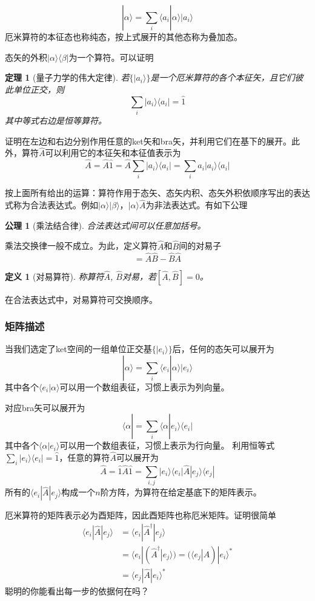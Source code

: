 \documentclass[a4paper,11pt]{ctexart}
\newcommand{\beq}{\begin{equation}}
\newcommand{\eeq}{\end{equation}}
\newcommand{\bea}{\begin{equation}\begin{aligned}}
\newcommand{\eea}{\end{aligned}\end{equation}}
\newcommand{\state}[1]{| #1 \rangle}
\newtheorem{thm}{定理}[section]
\newtheorem{axm}{公理}[section]
\newtheorem{dfn}{定义}[section]
\begin{document}
\beq
| \alpha \rangle = \sum_i \langle a_i | \alpha \rangle | a_i \rangle
\eeq
厄米算符的本征态也称纯态，按上式展开的其他态称为叠加态。
\par
态矢的外积$| \alpha \rangle \langle \beta |$为一个算符。可以证明
\begin{thm}[量子力学的伟大定律]
若$\{ | a_i \rangle \}$是一个厄米算符的各个本征矢，且它们彼此单位正交，则
\beq
\sum_i | a_i \rangle \langle a_i | = \hat{1}
\eeq
其中等式右边是恒等算符。
\end{thm}
证明在左边和右边分别作用任意的ket矢和bra矢，并利用它们在基下的展开。此外，算符$\hat{A}$可以利用它的本征矢和本征值表示为
\beq
\hat{A} = \hat{A} \hat{1} = \hat{A} \sum_i | a_i \rangle \langle a_i | = \sum_i a_i | a_i \rangle \langle a_i |
\eeq
\par
按上面所有给出的运算：算符作用于态矢、态矢内积、态矢外积依顺序写出的表达式称为合法表达式。例如$| \alpha \rangle | \beta \rangle$，$\state{\alpha} \hat{A}$为非法表达式。有如下公理
\begin{axm}[乘法结合律]
合法表达式间可以任意加括号。
\end{axm}
乘法交换律一般不成立。为此，定义算符$\hat{A}$和$\hat{B}$间的对易子
\beq
[\hat{A},\hat{B}] = \hat{A} \hat{B} - \hat{B} \hat{A}
\eeq
\begin{dfn}[对易算符]
称算符$\hat{A}$, $\hat{B}$对易，若$[\hat{A},\hat{B}]=0$。
\end{dfn}
在合法表达式中，对易算符可交换顺序。

\subsubsection{矩阵描述}
当我们选定了ket空间的一组单位正交基$\{ | e_i\rangle \}$后，任何的态矢可以展开为
\beq
| \alpha \rangle = \sum_i \langle e_i | \alpha \rangle | e_i \rangle
\eeq
其中各个$\langle e_i | \alpha \rangle$可以用一个数组表征，习惯上表示为列向量。
\par
对应bra矢可以展开为
\beq
\langle \alpha | = \sum_i \langle \alpha | e_i \rangle \langle e_i |
\eeq
其中各个$\langle \alpha | e_i \rangle$可以用一个数组表征，习惯上表示为行向量。
利用恒等式$\sum_i | e_i \rangle \langle e_i | = \hat{1}$，任意的算符$\hat{A}$可以展开为
\beq
\hat{A} = \hat{1} \hat{A} \hat{1} = \sum_{i,j} | e_i \rangle \langle e_i | \hat{A} | e_j \rangle \langle e_j |
\eeq
所有的$\langle e_i | \hat{A} | e_j \rangle$构成一个$n$阶方阵，为算符在给定基底下的矩阵表示。\par
厄米算符的矩阵表示必为酉矩阵，因此酉矩阵也称厄米矩阵。证明很简单
\bea
\langle e_i | \hat{A} | e_j \rangle &= \langle e_i | \hat{A}^\dagger | e_j \rangle \\
&= \langle e_i | (\hat{A}^\dagger | e_j \rangle) = (\langle e_j | \hat{A}) | e_i \rangle^* \\
&=\langle e_j | \hat{A} | e_i \rangle^*
\eea
聪明的你能看出每一步的依据何在吗？
\end{document}
